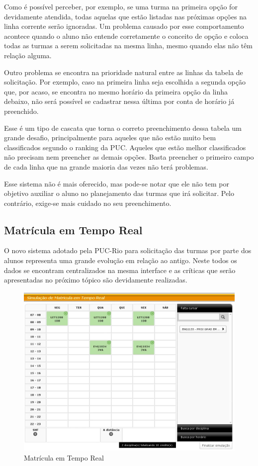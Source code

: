 \documentclass[graduacao,brazil]{ThesisPUC}
\begin{document}
Como é possível perceber, por exemplo, se uma turma na primeira opção for devidamente atendida, todas aquelas que estão listadas nas próximas opções na linha corrente serão ignoradas. Um problema causado por esse comportamento acontece quando o aluno não entende corretamente o conceito de opção e coloca todas as turmas a serem solicitadas na mesma linha, mesmo quando elas não têm relação alguma. 

Outro problema se encontra na prioridade natural entre as linhas da tabela de solicitação. Por exemplo, caso na primeira linha seja escolhida a segunda opção que, por acaso, se encontra no mesmo horário da primeira opção da linha debaixo, não será possível se cadastrar nessa última por conta de horário já preenchido. 

Esse é um tipo de cascata que torna o correto preenchimento dessa tabela um grande desafio, principalmente para aqueles que não estão muito bem classificados segundo o ranking da PUC. Aqueles que estão melhor classificados não precisam nem preencher as demais opções. Basta preencher o primeiro campo de cada linha que na grande maioria das vezes não terá problemas. 

Esse sistema não é mais oferecido, mas pode-se notar que ele não tem por objetivo auxiliar o aluno no planejamento das turmas que irá solicitar. Pelo contrário, exige-se mais cuidado no seu preenchimento. 

\subsection{Matrícula em Tempo Real}

O novo sistema adotado pela PUC-Rio para solicitação das turmas por parte dos alunos representa uma grande evolução em relação ao antigo. Neste todos os dados se encontram centralizados na mesma interface e as críticas que serão apresentadas no próximo tópico são devidamente realizadas.

\begin{figure}[H]
    \centering
    \includegraphics[width=\linewidth]{img/puc_online_novo.png}
    \caption{Matrícula em Tempo Real}
\end{figure}
\end{document}
